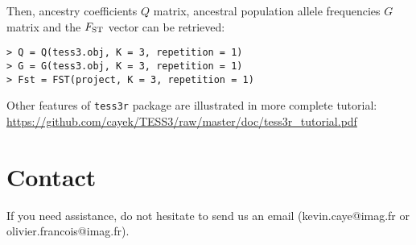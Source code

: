 \documentclass[10pt,a4paper]{article}
\begin{document}
\noindent Then, ancestry coefficients $Q$ matrix, ancestral population allele frequencies $G$ matrix 
and the $F_{\rm ST}$ vector
can be retrieved: 

\begin{Verbatim}[frame=single]
> Q = Q(tess3.obj, K = 3, repetition = 1)
> G = G(tess3.obj, K = 3, repetition = 1)
> Fst = FST(project, K = 3, repetition = 1)
\end{Verbatim}

\noindent Other features of {\tt tess3r} package are illustrated in more complete tutorial: 
\url{https://github.com/cayek/TESS3/raw/master/doc/tess3r_tutorial.pdf}


\section{Contact}
If you need assistance, do not hesitate to send us an email (kevin.caye@imag.fr 
or olivier.francois@imag.fr). 



\end{document}
